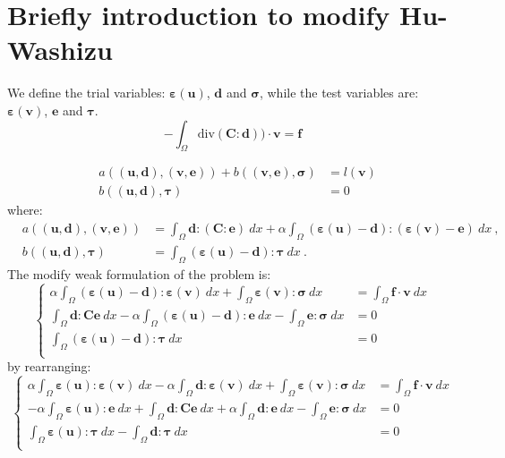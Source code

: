 \documentclass[a4paper,11pt]{article}
\begin{document}
\section{Briefly introduction to modify Hu-Washizu}
We define the trial variables: $\bm{\varepsilon}(\bm{u})$, $\bm{d}$ and 
$\bm{\sigma}$, while the test variables are: $\bm{\varepsilon}(\bm{v})$, 
$\bm{e}$ and $\bm{\tau}$. 
\begin{equation}
-\int_{\Omega} \mbox{div} ( \bm{C} : \bm{d}) )\cdot \bm{v} = \bm{f}
\end{equation}

\begin{eqnarray}
& a( (\bm{u},\bm{d}), (\bm{v}, \bm{e}) ) 
+ b( (\bm{v}, \bm{e}), \bm{\sigma} ) &= l(\bm{v}) \\
& b( (\bm{u},\bm{d}), \bm{\tau} )                                 &= 0
\end{eqnarray}
where:
\begin{eqnarray}
& a( (\bm{u},\bm{d}), (\bm{v}, \bm{e}) ) 
&= \int_{\Omega} \bm{d} : (\bm{C}:\bm{e}) \: dx 
+ \alpha \int_{\Omega} (\bm{\varepsilon}(\bm{u}) 
- \bm{d}):(\bm{\varepsilon}(\bm{v}) - \bm{e}) \: dx \:, \\
& b( (\bm{u},\bm{d}), \bm{\tau} ) &= 
\int_{\Omega} (\bm{\varepsilon}(\bm{u}) - \bm{d}) : \bm{\tau} \: dx \:.
\end{eqnarray}
The modify weak formulation of the problem is:
\begin{equation} \label{eq:system_1}
\left\lbrace
\begin{array}{lll}
\alpha\int_{\Omega}(\bm{\varepsilon}(\bm{u})-\bm{d}):
\bm{\varepsilon}(\bm{v})\:dx 
+\int_{\Omega}\bm{\varepsilon}(\bm{v}):\bm{\sigma}\:dx &=\int_{\Omega}
\bm{f}\cdot\bm{v}\:dx \\
\int_{\Omega}\bm{d}:\bm{C}\bm{e}\:dx-\alpha\int_{\Omega}
(\bm{\varepsilon}(\bm{u})-\bm{d}):\bm{e}\:dx 
-\int_{\Omega}\bm{e}:\bm{\sigma}\:dx &=0 \\
\int_{\Omega}(\bm{\varepsilon}(\bm{u})-\bm{d}):\bm{\tau}\:dx &= 0 \\
\end{array}
\right.
\end{equation}
by rearranging:
\begin{equation} \label{eq:system_2}
\left\lbrace
\begin{array}{lll}
\alpha\int_{\Omega}\bm{\varepsilon}(\bm{u}):\bm{\varepsilon}(\bm{v})\:dx 
-\alpha\int_{\Omega}\bm{d}:\bm{\varepsilon}(\bm{v})\:dx
+\int_{\Omega}\bm{\varepsilon}(\bm{v}):\bm{\sigma}\:dx 
&=\int_{\Omega}\bm{f}\cdot\bm{v}\:dx\\ 
-\alpha\int_{\Omega}\bm{\varepsilon}(\bm{u}):\bm{e}\:dx
+\int_{\Omega}\bm{d}:\bm{C}\bm{e}\:dx
+\alpha\int_{\Omega}\bm{d}:\bm{e}\:dx
-\int_{\Omega}\bm{e}:\bm{\sigma}\:dx&= 0 \\
\int_{\Omega}\bm{\varepsilon}(\bm{u}):\bm{\tau}\:dx
-\int_{\Omega}\bm{d}:\bm{\tau}\:dx &= 0 \\
\end{array}
\right.
\end{equation}
\end{document}
